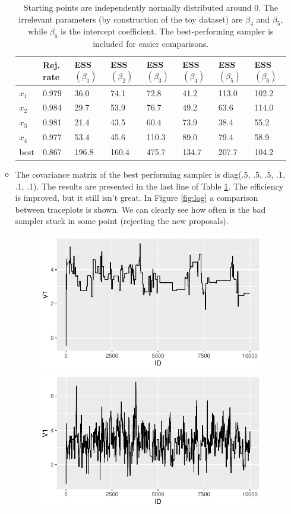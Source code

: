 \documentclass[12pt]{article}
\begin{document}
\begin{enumerate}[A)]
\begin{itemize}
        \begin{table}
            \begin{tabular}{l|l|llllll}
             & Rej. rate & ESS $(\beta_1)$ & ESS $(\beta_2)$ & ESS $(\beta_3)$ & ESS $(\beta_4)$ & ESS $(\beta_5)$ & ESS $(\beta_6)$ \\ \hline
            $x_1$ & 0.979 & 36.0 & 74.1 & 72.8 & 41.2 & 113.0 & 102.2 \\
            $x_2$ & 0.984 & 29.7 & 53.9 & 76.7 & 49.2 & 63.6 & 114.0 \\
            $x_3$ & 0.981 & 21.4 & 43.5 & 60.4 & 73.9 & 38.4 & 55.2 \\
            $x_4$ & 0.977 & 53.4 & 45.6 & 110.3 & 89.0 & 79.4 & 58.9 \\ \hline
            best & 0.867 & 196.8 & 160.4 & 475.7 & 134.7 & 207.7 &  104.2 \\
            \end{tabular}
            \caption{Starting points are independently normally distributed around 0. The irrelevant parameters (by construction of the toy dataset) are $\beta_4$ and $\beta_5$, while $\beta_6$ is the intercept coefficient. The best-performing sampler is included for easier comparisons.}
            \label{tab:log}
        \end{table}
        \item The covariance matrix of the best performing sampler is diag(.5, .5, .5, .1, .1, .1). The results are presented in the last line of Table \ref{tab:log}. The efficiency is improved, but it still isn't great. In Figure \ref{fig:log} a comparison between traceplots is shown. We can clearly see how often is the bad sampler stuck in some point (rejecting the new proposals).
        \begin{figure}
            \centering
            \includegraphics[width=.48\textwidth]{trace_bad.pdf}
            \hfill
            \includegraphics[width=.48\textwidth]{trace_best.pdf}

\end{figure}
\end{itemize}
\end{enumerate}
\end{document}
